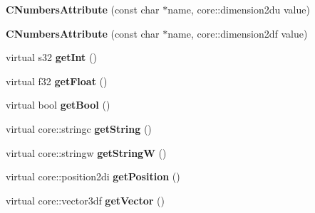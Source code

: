 \begin{DoxyCompactItemize}
\item 
\hypertarget{classirr_1_1io_1_1_c_numbers_attribute_a5c6e89b41919d557c82663e6e080675d}{{\bfseries C\-Numbers\-Attribute} (const char $\ast$name, core\-::dimension2du value)}\label{classirr_1_1io_1_1_c_numbers_attribute_a5c6e89b41919d557c82663e6e080675d}

\item 
\hypertarget{classirr_1_1io_1_1_c_numbers_attribute_ac95d52e5512c543fbebc920f1d3d2005}{{\bfseries C\-Numbers\-Attribute} (const char $\ast$name, core\-::dimension2df value)}\label{classirr_1_1io_1_1_c_numbers_attribute_ac95d52e5512c543fbebc920f1d3d2005}

\item 
\hypertarget{classirr_1_1io_1_1_c_numbers_attribute_a773ed7686b984c7903f1dd9701ef15bc}{virtual s32 {\bfseries get\-Int} ()}\label{classirr_1_1io_1_1_c_numbers_attribute_a773ed7686b984c7903f1dd9701ef15bc}

\item 
\hypertarget{classirr_1_1io_1_1_c_numbers_attribute_aeb9d0a82dc58362c7ff196623070a0bf}{virtual f32 {\bfseries get\-Float} ()}\label{classirr_1_1io_1_1_c_numbers_attribute_aeb9d0a82dc58362c7ff196623070a0bf}

\item 
\hypertarget{classirr_1_1io_1_1_c_numbers_attribute_aeeda8f469b0beaf2e3cb6a9be3396b97}{virtual bool {\bfseries get\-Bool} ()}\label{classirr_1_1io_1_1_c_numbers_attribute_aeeda8f469b0beaf2e3cb6a9be3396b97}

\item 
\hypertarget{classirr_1_1io_1_1_c_numbers_attribute_acca05806e732ebe988f4e9b7e09d3605}{virtual core\-::stringc {\bfseries get\-String} ()}\label{classirr_1_1io_1_1_c_numbers_attribute_acca05806e732ebe988f4e9b7e09d3605}

\item 
\hypertarget{classirr_1_1io_1_1_c_numbers_attribute_a9fc5e9dd6e9c18cfceb2cc3d8b35c3ca}{virtual core\-::stringw {\bfseries get\-String\-W} ()}\label{classirr_1_1io_1_1_c_numbers_attribute_a9fc5e9dd6e9c18cfceb2cc3d8b35c3ca}

\item 
\hypertarget{classirr_1_1io_1_1_c_numbers_attribute_a1f81fe938813b12eec4149d1f72b35e6}{virtual core\-::position2di {\bfseries get\-Position} ()}\label{classirr_1_1io_1_1_c_numbers_attribute_a1f81fe938813b12eec4149d1f72b35e6}

\item 
\hypertarget{classirr_1_1io_1_1_c_numbers_attribute_afa3aca35ef3f3ea794771f5469801a4f}{virtual core\-::vector3df {\bfseries get\-Vector} ()}\label{classirr_1_1io_1_1_c_numbers_attribute_afa3aca35ef3f3ea794771f5469801a4f}


\end{DoxyCompactItemize}

